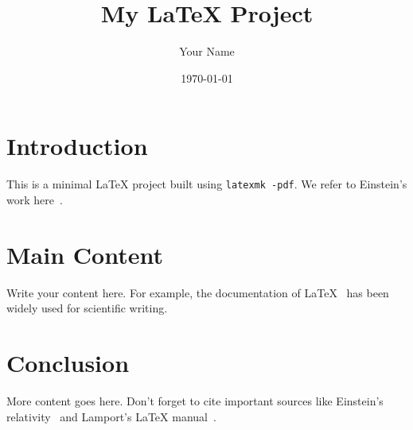 \documentclass[a4paper,12pt]{article}
\title{My LaTeX Project}
\author{Your Name}
\date{\today}
\begin{document}
\maketitle

\tableofcontents
\newpage

\section{Introduction}
This is a minimal LaTeX project built using \texttt{latexmk -pdf}.
We refer to Einstein's work here~\cite{einstein}.

\section{Main Content}
Write your content here. For example, the documentation of \LaTeX~\cite{latex} has been widely used for scientific writing.

\section{Conclusion}
More content goes here. Don't forget to cite important sources like Einstein's relativity~\cite{einstein} and Lamport's LaTeX manual~\cite{latex}.

\newpage


\end{document}
